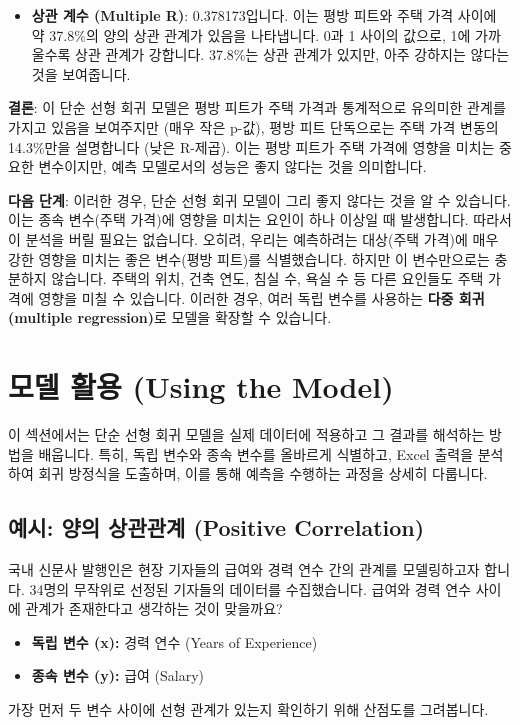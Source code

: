 \documentclass[11pt,a4paper]{article}
\theoremstyle{definition}
\begin{document}
\begin{tcolorbox}[examplebox, title=Excel 실습: Zillow 주택 데이터]
\begin{itemize}
    \item \textbf{상관 계수 (Multiple R)}: 0.378173입니다. 이는 평방 피트와 주택 가격 사이에 약 37.8\%의 양의 상관 관계가 있음을 나타냅니다. 0과 1 사이의 값으로, 1에 가까울수록 상관 관계가 강합니다. 37.8\%는 상관 관계가 있지만, 아주 강하지는 않다는 것을 보여줍니다.
\end{itemize}

\textbf{결론}:
이 단순 선형 회귀 모델은 평방 피트가 주택 가격과 통계적으로 유의미한 관계를 가지고 있음을 보여주지만 (매우 작은 p-값), 평방 피트 단독으로는 주택 가격 변동의 14.3\%만을 설명합니다 (낮은 R-제곱). 이는 평방 피트가 주택 가격에 영향을 미치는 중요한 변수이지만, 예측 모델로서의 성능은 좋지 않다는 것을 의미합니다.

\textbf{다음 단계}:
이러한 경우, 단순 선형 회귀 모델이 그리 좋지 않다는 것을 알 수 있습니다. 이는 종속 변수(주택 가격)에 영향을 미치는 요인이 하나 이상일 때 발생합니다. 따라서 이 분석을 버릴 필요는 없습니다. 오히려, 우리는 예측하려는 대상(주택 가격)에 매우 강한 영향을 미치는 좋은 변수(평방 피트)를 식별했습니다. 하지만 이 변수만으로는 충분하지 않습니다. 주택의 위치, 건축 연도, 침실 수, 욕실 수 등 다른 요인들도 주택 가격에 영향을 미칠 수 있습니다. 이러한 경우, 여러 독립 변수를 사용하는 \textbf{다중 회귀(multiple regression)}로 모델을 확장할 수 있습니다.
\end{tcolorbox}

\newpage
\section{모델 활용 (Using the Model)}
이 섹션에서는 단순 선형 회귀 모델을 실제 데이터에 적용하고 그 결과를 해석하는 방법을 배웁니다. 특히, 독립 변수와 종속 변수를 올바르게 식별하고, Excel 출력을 분석하여 회귀 방정식을 도출하며, 이를 통해 예측을 수행하는 과정을 상세히 다룹니다.

\subsection{예시: 양의 상관관계 (Positive Correlation)}
국내 신문사 발행인은 현장 기자들의 급여와 경력 연수 간의 관계를 모델링하고자 합니다. 34명의 무작위로 선정된 기자들의 데이터를 수집했습니다. 급여와 경력 연수 사이에 관계가 존재한다고 생각하는 것이 맞을까요?

\begin{itemize}
    \item \textbf{독립 변수 (x):} 경력 연수 (Years of Experience)
    \item \textbf{종속 변수 (y):} 급여 (Salary)
\end{itemize}
가장 먼저 두 변수 사이에 선형 관계가 있는지 확인하기 위해 산점도를 그려봅니다.
\end{document}
